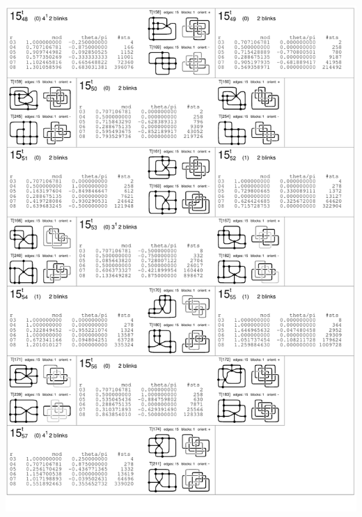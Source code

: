\begin{center}
 \includegraphics[height=23.5cm]{E.figsbw2/con3catalog012_bw.pdf} \eject 

\end{center}
